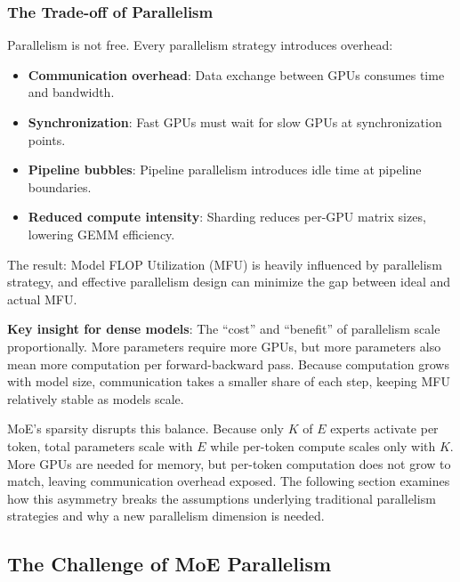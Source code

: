 \documentclass[10pt,logo,copyright]{nvidiatechreport}
\begin{document}
\subsubsection{The Trade-off of Parallelism}

Parallelism is not free. Every parallelism strategy introduces overhead:

\begin{itemize}
    \item \textbf{Communication overhead}: Data exchange between GPUs consumes time and bandwidth.
    \item \textbf{Synchronization}: Fast GPUs must wait for slow GPUs at synchronization points.
    \item \textbf{Pipeline bubbles}: Pipeline parallelism introduces idle time at pipeline boundaries.
    \item \textbf{Reduced compute intensity}: Sharding reduces per-GPU matrix sizes, lowering GEMM efficiency.
\end{itemize}

The result: Model FLOP Utilization (MFU) is heavily influenced by parallelism strategy, and effective parallelism design can minimize the gap between ideal and actual MFU.

\textbf{Key insight for dense models}: The ``cost'' and ``benefit'' of parallelism scale proportionally. More parameters require more GPUs, but more parameters also mean more computation per forward-backward pass. Because computation grows with model size, communication takes a smaller share of each step, keeping MFU relatively stable as models scale.

MoE's sparsity disrupts this balance. Because only $K$ of $E$ experts activate per token, total parameters scale with $E$ while per-token compute scales only with $K$. More GPUs are needed for memory, but per-token computation does not grow to match, leaving communication overhead exposed. The following section examines how this asymmetry breaks the assumptions underlying traditional parallelism strategies and why a new parallelism dimension is needed.

\subsection{The Challenge of MoE Parallelism}\label{sec:moe-parallelism-challenge}
\end{document}
